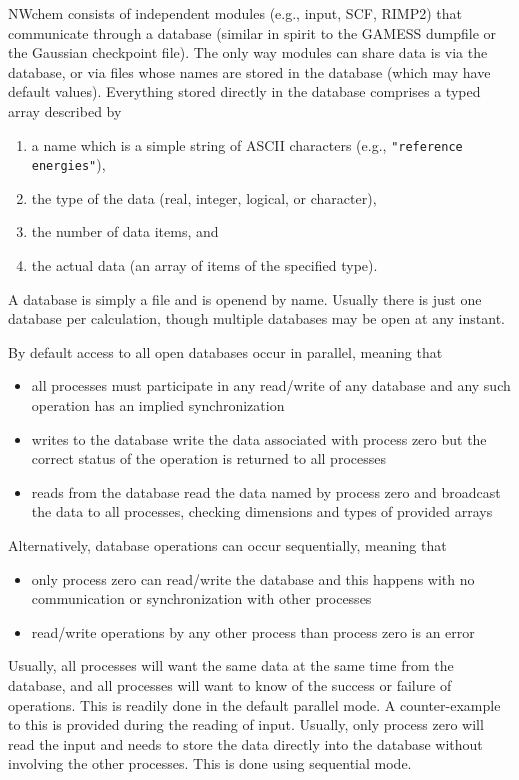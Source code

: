 
NWchem consists of independent modules (e.g., input, SCF, RIMP2) that
communicate through a database (similar in spirit to the GAMESS
dumpfile or the Gaussian checkpoint file).  The only way modules can
share data is via the database, or via files whose names are stored in
the database (which may have default values).  Everything stored
directly in the database comprises a typed array described by
\begin{enumerate}
\item a name which is a simple string of ASCII characters (e.g., 
      \verb+"reference energies"+),
\item the type of the data (real, integer, logical, or character), 
\item the number of data items, and
\item the actual data (an array of items of the specified type).
\end{enumerate}

A database is simply a file and is openend by name. Usually there is
just one database per calculation, though multiple databases may be
open at any instant.  

By default access to all open databases occur in parallel, meaning
that
\begin{itemize}
\item all processes must participate in any read/write of any database
  and any such operation has an implied synchronization
\item writes to the database write the data associated with process
  zero but the correct status of the operation is returned to all
  processes
\item reads from the database read the data named by process zero and
  broadcast the data to all processes, checking dimensions and types
  of provided arrays
\end{itemize}

Alternatively, database operations can occur sequentially, meaning
that
\begin{itemize}
\item only process zero can read/write the database and this happens
  with no communication or synchronization with other processes
\item read/write operations by any other process than process zero is
  an error
\end{itemize}

Usually, all processes will want the same data at the same time from
the database, and all processes will want to know of the success or
failure of operations.  This is readily done in the default parallel
mode.  A counter-example to this is provided during the reading of input.
Usually, only process zero will read the input and needs to store the
data directly into the database without involving the other processes.
This is done using sequential mode.

